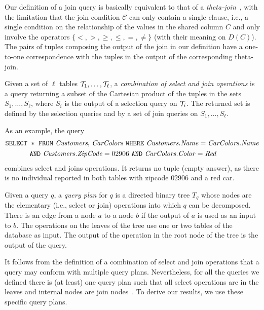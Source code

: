 Our definition of a join query is basically equivalent to that of a
\emph{theta-join}~\citep[Sect.5.2.7]{GarciaMolinaUW02}, with the limitation that
the join condition $\mathcal{C}$ can only contain a single clause, i.e., a single
condition on the relationship of the values in the shared column $C$ and only
involve the operators $\{<,>,\ge,\le,=,\neq\}$ (with their meaning on $D(C)$).
The pairs of tuples composing the output of the join in our definition have a
one-to-one correspondence with the tuples in the output of the corresponding
theta-join.

\begin{definition}\label{def:general query}
  Given a set of $\ell$ tables ${\cal T}_1,\dotsc,{\cal T}_\ell$, a
  \emph{combination of select and join operations} is a query returning a subset
  of the Cartesian product of the tuples in the sets $S_1,\dotsc,S_\ell$, where
  $S_i$ is the output of a selection query on ${\cal T}_i$. The returned set is
  defined by the selection queries and by a set of join queries on
  $S_1,\dotsc,S_\ell$.
\end{definition}
As an example, the query 
\begin{align*}
\mbox{\texttt{SELECT} } &* \mbox{ \texttt{FROM} \emph{Customers},
\emph{CarColors} \texttt{WHERE} 
\emph{Customers.Name}} = \mbox{\emph{CarColors.Name}} \\
& \mbox{\texttt{AND} \emph{Customers.ZipCode}}=02906 \mbox{ \texttt{AND}
\emph{CarColors.Color}}=\mbox{\emph{Red}}
\end{align*}
combines select and joins operations. It returns no tuple (empty answer), as
there is no individual reported in both tables with zipcode $02906$ and a red
car.

\begin{definition}\label{def:exectree}
  Given a query $q$, a \emph{query plan} for $q$ is a directed binary tree
  $T_q$ whose nodes are the elementary (i.e., select or join) operations into
  which $q$ can be decomposed. There is an edge from a node $a$ to a node $b$ if
  the output of $a$ is used as an input to $b$. The operations on the leaves of
  the tree use one or two tables of the database as input. The output of the
  operation in the root node of the tree is the output of the query.
\end{definition}

It follows from the definition of a combination of select and join operations
that a query may conform with multiple query plans. Nevertheless, for all the
queries we defined there is (at least) one query plan such that all select
operations are in the leaves and internal nodes are join
nodes~\citep{GarciaMolinaUW02}. To derive our results, we use these specific
query plans.

